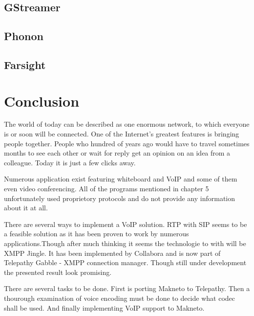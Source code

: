 \section{GStreamer}
\section{Phonon}
\section{Farsight}


\chapter{Conclusion}
The world of today can be described as one enormous network, to which everyone is or soon will be connected. One of the Internet's greatest features is bringing people together. People who hundred of years ago would have to travel sometimes months to see each other or wait for reply get an opinion on an idea from a colleague. Today it is just a few clicks away.

Numerous application exist featuring whiteboard and VoIP and some of them even video conferencing. All of the programs mentioned in chapter 5 unfortunately used proprietory protocols and do not provide any information about it at all. 

There are several ways to implement a VoIP solution. RTP with SIP seems to be a feasible solution as it has been proven to work by numerous applications.Though after much thinking it seems the technologie to with will be XMPP Jingle. It has been implemented by Collabora and is now part of Telepathy Gabble - XMPP connection manager. Though still under development the presented result look promising.

There are several tasks to be done. First is porting Makneto to Telepathy. Then a thourough examination of voice encoding must be done to decide what codec shall be used. And finally implementing VoIP support to Makneto.   



